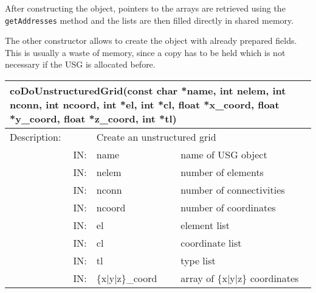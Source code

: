 After constructing the object, pointers to the arrays are retrieved using the 
{\tt getAddresses} method and the lists are then filled directly in shared memory.

The other constructor allows to create the object with already prepared fields. 
This is usually a waste of memory, since a copy has to be held which is not 
necessary if the USG is allocated before.

\latexonly
\begin{longtable}{|p{4cm}|p{2.5cm}|p{7cm}|}
\hline
\multicolumn{3}{|p{13.5cm}|}{\bf coDoUnstructuredGrid(const char *name,\newline
              int nelem, int nconn, int ncoord, int *el, int *cl,\newline
	      float *x\_coord, float *y\_coord, float *z\_coord,\newline
	      int *tl)}\\
\hline
{Description:}  
       & \multicolumn{2}{p{9.5cm}|}{Create an unstructured grid} \\
\hline
\multicolumn{1}{|r|}{IN:} & {name} 
                          & {name of USG object}\\
\hline
\multicolumn{1}{|r|}{IN:} & {nelem} 
                          & {number of elements}\\
\hline
\multicolumn{1}{|r|}{IN:} & {nconn} 
                          & {number of connectivities}\\
\hline
\multicolumn{1}{|r|}{IN:} & {ncoord} 
                          & {number of coordinates}\\
\hline
\multicolumn{1}{|r|}{IN:} & {el} 
                          & {element list}\\
\hline
\multicolumn{1}{|r|}{IN:} & {cl} 
                          & {coordinate list}\\
\hline
\multicolumn{1}{|r|}{IN:} & {tl} 
                          & {type list}\\
\hline
\multicolumn{1}{|r|}{IN:} & {\{x$\mid$y$\mid$z\}\_coord} 
                          & {array of \{x$\mid$y$\mid$z\} 
			  coordinates}\endhead  
\hline
\end{longtable}
\endlatexonly

